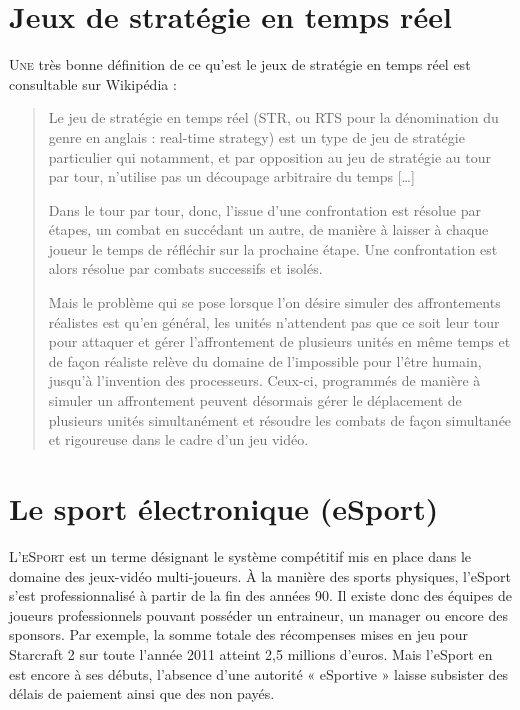 \section{Jeux de stratégie en temps réel}%
\label{sec:jeux_de_strategie_en_temps_reel}

\lettrine{U}{ne} très bonne définition de ce qu'est le jeux de stratégie en
temps réel est consultable sur Wikipédia :

\begin{quote}

Le jeu de stratégie en temps réel (STR, ou RTS pour la
dénomination du genre en anglais : real-time strategy) est un type de
jeu de stratégie particulier qui notamment, et par opposition au jeu de
stratégie au tour par tour, n’utilise pas un découpage arbitraire du
temps [\ldots]

Dans le tour par tour, donc, l'issue d’une confrontation est résolue par
étapes, un combat en succédant un autre, de manière à laisser à chaque
joueur le temps de réfléchir sur la prochaine étape. Une confrontation
est alors résolue par combats successifs et isolés.

Mais le problème qui se pose lorsque l'on désire simuler des affrontements
réalistes est qu’en général, les unités n’attendent pas que ce soit leur
tour pour attaquer et gérer l'affrontement de plusieurs unités en même
temps et de façon réaliste relève du domaine de l'impossible pour l'être
humain, jusqu'à l'invention des processeurs. Ceux-ci, programmés de
manière à simuler un affrontement peuvent désormais gérer le déplacement
de plusieurs unités simultanément et résoudre les combats de façon
simultanée et rigoureuse dans le cadre d’un jeu vidéo.

\end{quote}

\section{Le sport électronique (eSport)}%
\label{sec:le_sport_electronique_esport_}

\lettrine{L}{’eSport} est un terme désignant le
système compétitif mis en place dans le domaine des jeux-vidéo
multi-joueurs. À la manière des sports physiques, l'eSport s’est
professionnalisé à partir de la fin des années 90. Il existe donc des
équipes de joueurs professionnels pouvant posséder un entraineur, un
manager ou encore des sponsors. Par exemple, la somme totale des
récompenses mises en jeu pour Starcraft 2 sur toute l’année 2011 atteint
2,5 millions d’euros.  Mais l'eSport en est encore à ses débuts,
l'absence d'une autorité « eSportive » laisse subsister des délais de
paiement ainsi que des non payés.

